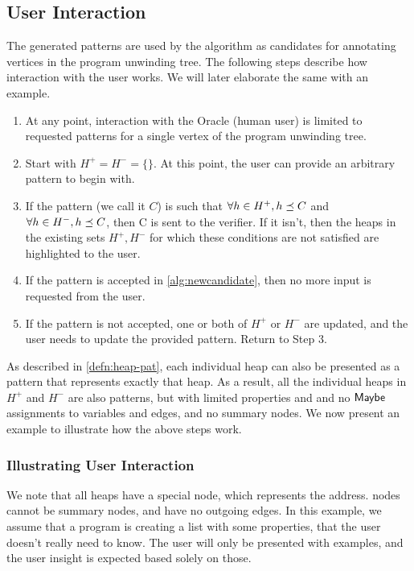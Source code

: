 \subsection{User Interaction}
The generated patterns are used by the \verifier algorithm as candidates for annotating vertices in the program unwinding tree. The following steps describe how interaction with the user works. We will later elaborate the same with an example.

\begin{enumerate}
  \item At any point, interaction with the Oracle (human user) is limited to requested patterns for a single vertex of the program unwinding tree.
  \item Start with $H^{+} = H^{-} = \{\}$. At this point, the user can provide an arbitrary pattern to begin with.
  \item If the pattern (we call it $C$) is such that $\forall h \in H^{+}, h \preceq C$ and $\forall h \in H^{-}, h \preceq C$, then C is sent to the verifier. If it isn't, then the heaps in the existing sets $H^{+}, H^{-}$ for which these conditions are not satisfied are highlighted to the user.
  \item If the pattern is accepted in \autoref{alg:newcandidate}, then no more input is requested from the user.
  \item If the pattern is not accepted, one or both of $H^{+}$ or $H^{-}$ are updated, and the user needs to update the provided pattern. Return to Step 3.
\end{enumerate}

As described in \autoref{defn:heap-pat}, each individual heap can also be presented as a pattern that represents exactly that heap. As a result, all the individual heaps in $H^{+}$ and $H^{-}$ are also patterns, but with limited properties and and no $\mathsf{Maybe}$ assignments to variables and edges, and no summary nodes. We now present an example to illustrate how the above steps work.

\subsubsection{Illustrating User Interaction}
We note that all heaps have a special \nilconst node, which represents the \nullconst address. \nilconst nodes cannot be summary nodes, and have no outgoing edges. In this example, we assume that a program is creating a list with some properties, that the user doesn't really need to know. The user will only be presented with examples, and the user insight is expected based solely on those.

